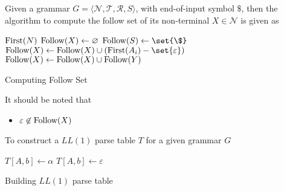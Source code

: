 \begin{definition}
    Given a grammar $G = \langle \mathcal{N}, \mathcal{T}, \mathcal{R}, S \rangle$, with end-of-input symbol $\$$, then the algorithm to compute the follow set of its non-terminal $X \in \mathcal{N}$ is given as
    \begin{algorithm}[H]
        \begin{algorithmic}[1]
                \State $\mathrm{First}{(N)}$ \gets {}
            \EndFor
            \State $\mathrm{Follow}{(X)} \gets \varnothing$
            \State $\Follow{S} \gets \set{\$}$ 
                    \State $\Follow{X} \gets \Follow{X} \cup (\First{A_i} - \set{\varepsilon})$
                        \State {}
                    \EndIf
                \EndFor
                \State $\mathrm{Follow}{(X)} \gets \mathrm{Follow}{(X)} \cup \mathrm{Follow}{(Y)}$ 
            \EndFor
            \EndProcedure
        \end{algorithmic}
        \caption{Computing Follow Set}
        \label{prog:compute-follow-set}
    \end{algorithm}
    
    It should be noted that
    \begin{itemize}
        \item $\varepsilon \not\in \mathrm{Follow}{(X)}$
    \end{itemize}
\end{definition}

\begin{definition}
    To construct a $LL(1)$ parse table $T$ for a given grammar $G$
    \begin{algorithm}[H]
        \begin{algorithmic}[1]
                        \State $T[A, b] \gets \alpha$
                    \EndFor
                    \If{$\alpha \to^\ast \varepsilon$}
                            \State $T[A, b] \gets \varepsilon$
                        \EndFor
                    \EndIf
                \EndFor
            \EndProcedure
        \end{algorithmic}
        \caption{Building $LL(1)$ parse table}
        \label{prog:build-ll(1)-parse-table}
    \end{algorithm}
\end{definition}

